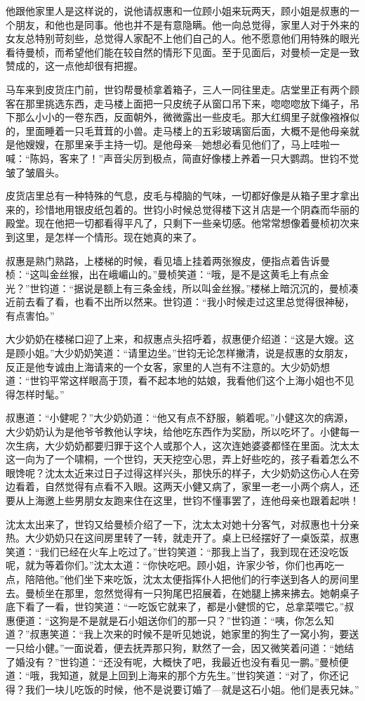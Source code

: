 \par 他跟他家里人是这样说的，说他请叔惠和一位顾小姐来玩两天，顾小姐是叔惠的一个朋友，和他也是同事。他也并不是有意隐瞒。他一向总觉得，家里人对于外来的女友总特别苛刻些，总觉得人家配不上他们自己的人。他不愿意他们用特殊的眼光看待曼桢，而希望他们能在较自然的情形下见面。至于见面后，对曼桢一定是一致赞成的，这一点他却很有把握。
\par 马车来到皮货庄门前，世钧帮曼桢拿着箱子，三人一同往里走。店堂里正有两个顾客在那里挑选东西，走马楼上面把一只皮统子从窗口吊下来，唿唿唿放下绳子，吊下那么小小的一卷东西，反面朝外，微微露出一些皮毛。那大红绸里子就像襁褓似的，里面睡着一只毛茸茸的小兽。走马楼上的五彩玻璃窗后面，大概不是他母亲就是他嫂嫂，在那里亲手主持一切。是他母亲—她想必看见他们了，马上哇啦一喊：“陈妈，客来了！”声音尖厉到极点，简直好像楼上养着一只大鹦鹉。世钧不觉皱了皱眉头。
\par 皮货店里总有一种特殊的气息，皮毛与樟脑的气味，一切都好像是从箱子里才拿出来的，珍惜地用银皮纸包着的。世钧小时候总觉得楼下这爿店是一个阴森而华丽的殿堂。现在他把一切都看得平凡了，只剩下一些亲切感。他常常想像着曼桢初次来到这里，是怎样一个情形。现在她真的来了。
\par 叔惠是熟门熟路，上楼梯的时候，看见墙上挂着两张猴皮，便指点着告诉曼桢：“这叫金丝猴，出在峨嵋山的。”曼桢笑道：“哦，是不是这黄毛上有点金光？”世钧道：“据说是额上有三条金线，所以叫金丝猴。”楼梯上暗沉沉的，曼桢凑近前去看了看，也看不出所以然来。世钧道：“我小时候走过这里总觉得很神秘，有点害怕。”
\par 大少奶奶在楼梯口迎了上来，和叔惠点头招呼着，叔惠便介绍道：“这是大嫂。这是顾小姐。”大少奶奶笑道：“请里边坐。”世钧无论怎样撇清，说是叔惠的女朋友，反正是他专诚由上海请来的一个女客，家里的人岂有不注意的。大少奶奶想道：“世钧平常这样眼高于顶，看不起本地的姑娘，我看他们这个上海小姐也不见得怎样时髦。”
\par 叔惠道：“小健呢？”大少奶奶道：“他又有点不舒服，躺着呢。”小健这次的病源，大少奶奶认为是他爷爷教他认字块，给他吃东西作为奖励，所以吃坏了。小健每一次生病，大少奶奶都要归罪于这个人或那个人，这次连她婆婆都怪在里面。沈太太这一向为了一个啸桐，一个世钧，天天挖空心思，弄上好些吃的，孩子看着怎么不眼馋呢？沈太太近来过日子过得这样兴头，那快乐的样子，大少奶奶这伤心人在旁边看着，自然觉得有点看不入眼。这两天小健又病了，家里一老一小两个病人，还要从上海邀上些男朋女友跑来住在这里，世钧不懂事罢了，连他母亲也跟着起哄！
\par 沈太太出来了，世钧又给曼桢介绍了一下，沈太太对她十分客气，对叔惠也十分亲热。大少奶奶只在这间房里转了一转，就走开了。桌上已经摆好了一桌饭菜，叔惠笑道：“我们已经在火车上吃过了。”世钧笑道：“那我上当了，我到现在还没吃饭呢，就为等着你们。”沈太太道：“你快吃吧。顾小姐，许家少爷，你们也再吃一点，陪陪他。”他们坐下来吃饭，沈太太便指挥仆人把他们的行李送到各人的房间里去。曼桢坐在那里，忽然觉得有一只狗尾巴招展着，在她腿上拂来拂去。她朝桌子底下看了一看，世钧笑道：“一吃饭它就来了，都是小健惯的它，总拿菜喂它。”叔惠便道：“这狗是不是就是石小姐送你们的那一只？”世钧道：“咦，你怎么知道？”叔惠笑道：“我上次来的时候不是听见她说，她家里的狗生了一窝小狗，要送一只给小健。”一面说着，便去抚弄那只狗，默然了一会，因又微笑着问道：“她结了婚没有？”世钧道：“还没有呢，大概快了吧，我最近也没有看见一鹏。”曼桢便道：“哦，我知道，就是上回到上海来的那个方先生。”世钧笑道：“对了，你还记得？我们一块儿吃饭的时候，他不是说要订婚了—就是这石小姐。他们是表兄妹。”
